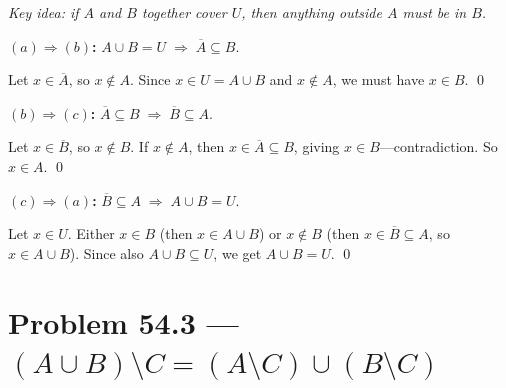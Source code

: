 \documentclass[12pt, a4paper]{article}
\newcommand{\comp}[1]{\overline{#1}}
\begin{document}
\begin{center}
\end{center}

\smallskip
\textit{Key idea: if $A$ and $B$ together cover $U$, then anything outside $A$ must be in $B$.}

\smallskip
\textbf{$(a) \Rightarrow (b)$:}\;
$A \cup B = U \;\Longrightarrow\; \comp{A} \subseteq B$.

Let $x \in \comp{A}$, so $x \notin A$.
Since $x \in U = A \cup B$ and $x \notin A$, we must have $x \in B$. \qed

\textbf{$(b) \Rightarrow (c)$:}\;
$\comp{A} \subseteq B \;\Longrightarrow\; \comp{B} \subseteq A$.

Let $x \in \comp{B}$, so $x \notin B$.
If $x \notin A$, then $x \in \comp{A} \subseteq B$, giving $x \in B$---contradiction.
So $x \in A$. \qed

\textbf{$(c) \Rightarrow (a)$:}\;
$\comp{B} \subseteq A \;\Longrightarrow\; A \cup B = U$.

Let $x \in U$. Either $x \in B$ (then $x \in A \cup B$)
or $x \notin B$ (then $x \in \comp{B} \subseteq A$, so $x \in A \cup B$).
Since also $A \cup B \subseteq U$, we get $A \cup B = U$. \qed

\newpage
\section{Problem 54.3 --- $(A \cup B) \setminus C = (A \setminus C) \cup (B \setminus C)$}
\end{document}
